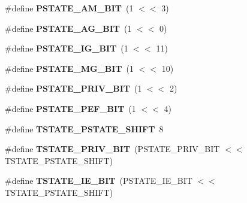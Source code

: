 \begin{DoxyCompactItemize}
\mbox{\label{group__RTEMSBSPsSPARC64_gafd5157c334441623a750a5e673592735}} 
\#define {\bfseries P\+S\+T\+A\+T\+E\+\_\+\+A\+M\+\_\+\+B\+IT}~(1 $<$$<$ 3)
\item 
\mbox{\label{group__RTEMSBSPsSPARC64_gae242878cc2fa00b2eb18cef667679cda}} 
\#define {\bfseries P\+S\+T\+A\+T\+E\+\_\+\+A\+G\+\_\+\+B\+IT}~(1 $<$$<$ 0)
\item 
\mbox{\label{group__RTEMSBSPsSPARC64_ga43c9de6b4e4a34d9ff4bfbf377933ad6}} 
\#define {\bfseries P\+S\+T\+A\+T\+E\+\_\+\+I\+G\+\_\+\+B\+IT}~(1 $<$$<$ 11)
\item 
\mbox{\label{group__RTEMSBSPsSPARC64_gaa1d4880a218b3a286ab2b2e429125de9}} 
\#define {\bfseries P\+S\+T\+A\+T\+E\+\_\+\+M\+G\+\_\+\+B\+IT}~(1 $<$$<$ 10)
\item 
\mbox{\label{group__RTEMSBSPsSPARC64_gac1d4742a3a32bbb72d79fde3f17a9565}} 
\#define {\bfseries P\+S\+T\+A\+T\+E\+\_\+\+P\+R\+I\+V\+\_\+\+B\+IT}~(1 $<$$<$ 2)
\item 
\mbox{\label{group__RTEMSBSPsSPARC64_gaf633fb358c0be7ca0371003dae12331b}} 
\#define {\bfseries P\+S\+T\+A\+T\+E\+\_\+\+P\+E\+F\+\_\+\+B\+IT}~(1 $<$$<$ 4)
\item 
\mbox{\label{group__RTEMSBSPsSPARC64_ga74095f391c47be6860a7e58620aac30d}} 
\#define {\bfseries T\+S\+T\+A\+T\+E\+\_\+\+P\+S\+T\+A\+T\+E\+\_\+\+S\+H\+I\+FT}~8
\item 
\mbox{\label{group__RTEMSBSPsSPARC64_ga2cd25439e8788b457130cf7dec4236b6}} 
\#define {\bfseries T\+S\+T\+A\+T\+E\+\_\+\+P\+R\+I\+V\+\_\+\+B\+IT}~(P\+S\+T\+A\+T\+E\+\_\+\+P\+R\+I\+V\+\_\+\+B\+IT $<$$<$ T\+S\+T\+A\+T\+E\+\_\+\+P\+S\+T\+A\+T\+E\+\_\+\+S\+H\+I\+FT)
\item 
\mbox{\label{group__RTEMSBSPsSPARC64_ga260fb6a446f35893ccba6e88a4c75617}} 
\#define {\bfseries T\+S\+T\+A\+T\+E\+\_\+\+I\+E\+\_\+\+B\+IT}~(P\+S\+T\+A\+T\+E\+\_\+\+I\+E\+\_\+\+B\+IT $<$$<$ T\+S\+T\+A\+T\+E\+\_\+\+P\+S\+T\+A\+T\+E\+\_\+\+S\+H\+I\+FT)

\end{DoxyCompactItemize}
